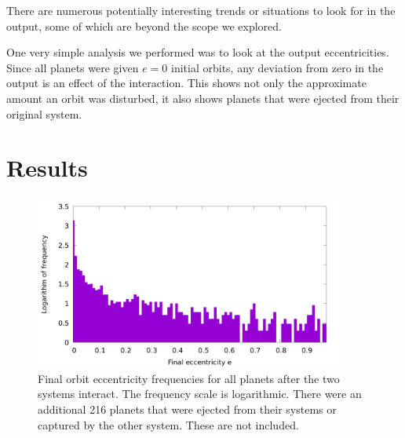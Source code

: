 \documentclass[12pt]{article}
\begin{document}
    There are numerous potentially interesting trends or situations to look for in
    the output, some of which are beyond the scope we explored. 
    
    One very simple analysis we performed was to look at the output
    eccentricities. Since all planets were given $e=0$ initial orbits, any deviation
    from zero in the output is an effect of the interaction. This shows not only the
    approximate amount an orbit was disturbed, it also shows planets that were ejected
    from their original system.


\section{Results}

    \begin{figure}[H]
        \centering
        \caption{Final orbit eccentricity frequencies for all planets 
            after the two systems interact. The frequency scale is logarithmic.
            There were an additional 216 planets that were ejected from their
            systems or captured by the other system. These are not included.}
        \includegraphics[width=4in]{eccentricity_final}
    \end{figure}
\end{document}
